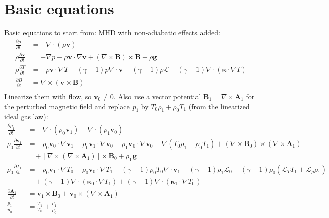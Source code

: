 \documentclass[11pt, fleqn]{article}
\newcommand{\HL}{\mathscr{L}}
\newcommand{\bv}{\boldsymbol{v}}
\newcommand{\bb}{\boldsymbol{B}}
\newcommand{\bg}{\boldsymbol{g}}
\newcommand{\bA}{\boldsymbol{A}}
\newcommand{\bkappa}{\boldsymbol{\kappa}}
\begin{document}
\section{Basic equations}
Basic equations to start from: MHD with non-adiabatic effects added:
\begin{equation}
	\begin{aligned}
		\frac{\partial \rho}{\partial t}      &= -\nabla \cdot (\rho \bv)		\\
		\rho\frac{\partial \bv}{\partial t}   &= -\nabla p - \rho\bv \cdot \nabla\bv + (\nabla \times \bb) \times \bb + \rho\bg	\\
		\rho\frac{\partial T}{\partial t}			&= -\rho\bv \cdot \nabla T - (\gamma - 1)p\nabla \cdot \bv - (\gamma - 1)\rho\HL + (\gamma - 1)\nabla \cdot (\bkappa \cdot \nabla T)	\\
		\frac{\partial B}{\partial t}					&= \nabla \times (\bv \times \bb)	\\
	\end{aligned}
\end{equation}
Linearize them with flow, so $\bv_0 \neq 0$. Also use a vector potential $\bb_1 = \nabla \times \bA_1$ for the perturbed magnetic field and replace $p_1$ by $T_0\rho_1 + \rho_0 T_1$ (from the linearized ideal gas law):
\begin{equation}
	\begin{aligned}
		\frac{\partial \rho_1}{\partial t}			&= -\nabla \cdot (\rho_0\bv_1) - \nabla \cdot (\rho_1\bv_0)	\\
		\rho_0\frac{\partial \bv_1}{\partial t}	&= - \rho_0\bv_0 \cdot \nabla \bv_1 - \rho_0\bv_1 \cdot \nabla \bv_0 - \rho_1\bv_0 \cdot \nabla \bv_0 - \nabla(T_0\rho_1 + \rho_0 T_1) + (\nabla \times \bb_0) \times (\nabla \times \bA_1)	\\
																					  &~~~~ + \left[\nabla \times (\nabla \times \bA_1) \right] \times \bb_0 + \rho_1 \bg	\\
		\rho_0\frac{\partial T_1}{\partial t}		&= -\rho_0\bv_1 \cdot \nabla T_0 - \rho_0\bv_0 \cdot \nabla T_1 - (\gamma - 1)\rho_0 T_0 \nabla \cdot \bv_1 - (\gamma - 1)\rho_1 \HL_0 - (\gamma - 1)\rho_0(\HL_T T_1 + \HL_\rho \rho_1)		\\
																						&~~~~ +(\gamma - 1)\nabla \cdot (\bkappa_0 \cdot \nabla T_1) + (\gamma - 1)\nabla \cdot (\bkappa_1 \cdot \nabla T_0)	\\
		\frac{\partial \bA_1}{\partial t}				&= \bv_1 \times \bb_0 + \bv_0 \times (\nabla \times \bA_1)	\\
		\frac{p_1}{p_0}													&= \frac{T_1}{T_0} + \frac{\rho_1}{\rho_0}
	\end{aligned}
\end{equation}
\end{document}
